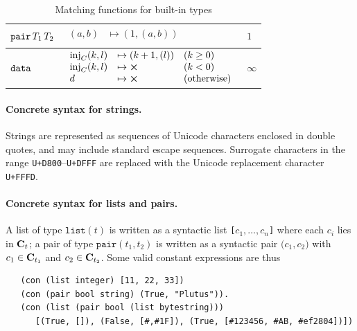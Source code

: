 {\begin{table}[H]
\begin{tabular}{|l|l|l|}
        \\
        $\mathtt{pair}\, T_1\, T_2$ &
        {\renewcommand*{\arraystretch}{1}
        $ \begin{array}{ll}
        (a,b) & \mapsto (1,(a,b))\\
        \end{array}$
        }
        & $1$
        \\
  \hline
        $\mathtt{data}$ &
        {\renewcommand*{\arraystretch}{1}
        $ \begin{array}{lll}
         \inj_C(k,l) & \mapsto (k+1,(l)) & (k \geq 0)\\
         \inj_C(k,l) & \mapsto \errorX   & (k < 0)\\
         d           & \mapsto \errorX   & \text{(otherwise)}
        \end{array}$
        }
        & $\infty$
        \\
        \hline
        \end{tabular}
   \caption{Matching functions for built-in types}
    \label{table:builtin-matching-functions}
\end{table}
}



\paragraph{Concrete syntax for strings.} Strings are represented as sequences of Unicode characters
enclosed in double quotes, and may include standard escape sequences.  Surrogate
characters in the range \texttt{U+D800}--\texttt{U+DFFF} are replaced with the
Unicode replacement character \texttt{U+FFFD}.


\paragraph{Concrete syntax for lists and pairs.}
A list of type $\texttt{list}(t)$ is written as a syntactic list
\texttt{[$c_1, \ldots, c_n$]} where each $c_i$ lies in $\mathbf{C}_t$; a pair of type
$\texttt{pair}(t_1,t_2)$ is written as a syntactic pair $\texttt{(}c_1,c_2\texttt{)}$
with $c_1 \in \mathbf{C}_{t_1}$ and $c_2 \in \mathbf{C}_{t_2}$.  Some valid constant expressions
are thus

\begin{verbatim}
   (con (list integer) [11, 22, 33])
   (con (pair bool string) (True, "Plutus")).
   (con (list (pair bool (list bytestring)))
      [(True, []), (False, [#,#1F]), (True, [#123456, #AB, #ef2804])])
\end{verbatim}


